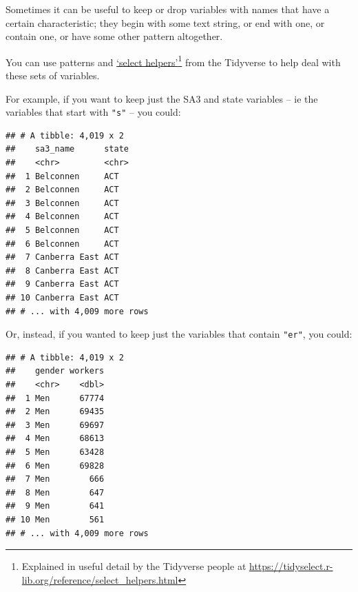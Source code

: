 \documentclass[]{book}
\newenvironment{Shaded}{\begin{snugshade}}{\end{snugshade}}
\newcommand{\KeywordTok}[1]{\textcolor[rgb]{0.13,0.29,0.53}{\textbf{#1}}}
\newcommand{\NormalTok}[1]{#1}
\newcommand{\OperatorTok}[1]{\textcolor[rgb]{0.81,0.36,0.00}{\textbf{#1}}}
\newcommand{\StringTok}[1]{\textcolor[rgb]{0.31,0.60,0.02}{#1}}
\begin{document}
Sometimes it can be useful to keep or drop variables with names that have a certain characteristic; they begin with some text string, or end with one, or contain one, or have some other pattern altogether.

You can use patterns and \href{https://tidyselect.r-lib.org/reference/select_helpers.html}{`select helpers'}\footnote{Explained in useful detail by the Tidyverse people at \url{https://tidyselect.r-lib.org/reference/select_helpers.html}}
from the Tidyverse to help deal with these sets of variables.

For example, if you want to keep just the SA3 and state variables -- ie the variables that start with \texttt{"s"} -- you could:

\begin{Shaded}
\end{Shaded}

\begin{verbatim}
## # A tibble: 4,019 x 2
##    sa3_name      state
##    <chr>         <chr>
##  1 Belconnen     ACT  
##  2 Belconnen     ACT  
##  3 Belconnen     ACT  
##  4 Belconnen     ACT  
##  5 Belconnen     ACT  
##  6 Belconnen     ACT  
##  7 Canberra East ACT  
##  8 Canberra East ACT  
##  9 Canberra East ACT  
## 10 Canberra East ACT  
## # ... with 4,009 more rows
\end{verbatim}

Or, instead, if you wanted to keep just the variables that contain \texttt{"er"}, you could:

\begin{Shaded}
\end{Shaded}

\begin{verbatim}
## # A tibble: 4,019 x 2
##    gender workers
##    <chr>    <dbl>
##  1 Men      67774
##  2 Men      69435
##  3 Men      69697
##  4 Men      68613
##  5 Men      63428
##  6 Men      69828
##  7 Men        666
##  8 Men        647
##  9 Men        641
## 10 Men        561
## # ... with 4,009 more rows
\end{verbatim}
\end{document}
